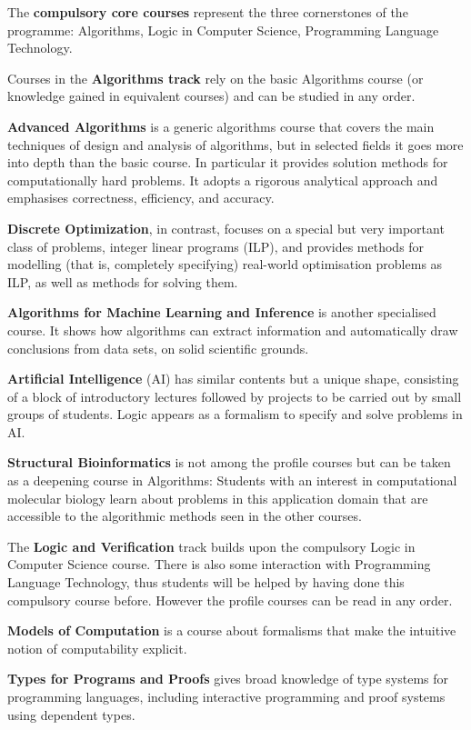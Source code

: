 \documentclass[twocolumn]{article}
\begin{document}
\bigskip
%
The {\bf compulsory core courses} represent the three cornerstones of the 
programme: Algorithms, Logic in Computer Science, Programming Language 
Technology.

\bigskip
%
Courses in the {\bf Algorithms track} rely on the basic Algorithms course (or
knowledge gained in equivalent courses) and can be studied in any order.

{\bf Advanced Algorithms} is a generic algorithms course that covers
the main techniques of design and analysis of algorithms, but in
selected fields it goes more into depth than the basic course. In
particular it provides solution methods for computationally hard
problems. It adopts a rigorous analytical approach and emphasises
correctness, efficiency, and accuracy.

{\bf Discrete Optimization}, in contrast, focuses on a special but
very important class of problems, integer linear programs (ILP), and
provides methods for modelling (that is, completely specifying)
real-world optimisation problems as ILP, as well as methods for
solving them.

{\bf Algorithms for Machine Learning and Inference} is another
specialised course. It shows how algorithms can extract information
and automatically draw conclusions from data sets, on solid scientific
grounds.

{\bf Artificial Intelligence} (AI) has similar contents but a unique
shape, consisting of a block of introductory lectures followed by
projects to be carried out by small groups of students. Logic appears
as a formalism to specify and solve problems in AI.

{\bf Structural Bioinformatics} is not among the profile courses but
can be taken as a deepening course in Algorithms: Students with an
interest in computational molecular biology learn about problems in
this application domain that are accessible to the algorithmic methods
seen in the other courses.

\bigskip
%
The {\bf Logic and Verification} track builds upon the compulsory
Logic in Computer Science course. There is also some interaction with
Programming Language Technology, thus students will be helped by
having done this compulsory course before. However the profile courses
can be read in any order.

{\bf Models of Computation} is a course about formalisms that make the
intuitive notion of computability explicit.

{\bf Types for Programs and Proofs} gives broad knowledge of type
systems for programming languages, including interactive programming
and proof systems using dependent types.
\end{document}
